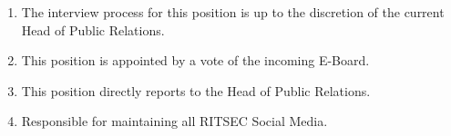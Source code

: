 
\begin{enumerate}
  \item The interview process for this position is up to the discretion of the current Head of Public Relations.
  \item This position is appointed by a vote of the incoming E-Board.
  \item This position directly reports to the Head of Public Relations.
  \item Responsible for maintaining all RITSEC Social Media. 
\end{enumerate}
